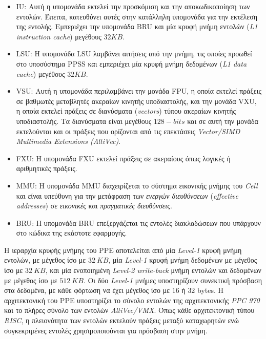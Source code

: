 \begin{itemize}

\item{\acf{IU}: Αυτή η υπομονάδα εκτελεί την προσκόμιση και την αποκωδικοποίηση των εντολών. Έπειτα, κατευθύνει αυτές στην κατάλληλη υπομονάδα για την εκτέλεση της εντολής. Εμπεριέχει την υπομονάδα \acf{BRU} και μία κρυφή μνήμη εντολών (\textsl{L1 instruction cache}) μεγέθους \(32KB\).}

\item{\acf{LSU}: Η υπομονάδα \ac{LSU} λαμβάνει αιτήσεις από την μνήμη, τις οποίες προωθεί στο υποσύστημα \ac{PPSS} και εμπεριέχει μία κρυφή μνήμη δεδομένων (\textsl{L1 data cache}) μεγέθους \(32KB\).}

\item{\acf{VSU}: Αυτή η υπομονάδα περιλαμβάνει την μονάδα \acf{FPU}, η οποία εκτελεί πράξεις σε βαθμωτές μεταβλητές ακεραίων κινητής υποδιαστολής, και την μονάδα \acf{VXU}, η οποία εκτελεί πράξεις σε διανύσματα (\textsl{vectors}) τύπου ακεραίων κινητής υποδιαστολής. Τα διανύσματα είναι μεγέθους \(128-bits\) και σε αυτή την μονάδα εκτελούνται και οι πράξεις που ορίζονται από τις επεκτάσεις \textsl{Vector/SIMD Multimedia Extensions (AltiVec)}.}

\item{\acf{FXU}: Η υπομονάδα \ac{FXU} εκτελεί πράξεις σε ακεραίους όπως λογικές ή αριθμητικές πράξεις.}

\item{\acf{MMU}: Η υπομονάδα \ac{MMU} διαχειρίζεται το σύστημα εικονικής μνήμης του \textsl{Cell} και είναι υπεύθυνη για την μετάφραση των \textsl{ενεργών διευθύνσεων} (\textsl{effective addresses}) σε \textsl{εικονικές} και \textsl{πραγματικές διευθύνσεις}.}

\item{\acf{BRU}: Η υπομονάδα \ac{BRU} επεξεργάζεται τις εντολές διακλαδώσεων που υπάρχουν στο κώδικα της εκάστοτε εφαρμογής.}

\end{itemize}
\indent
Η ιεραρχία κρυφής μνήμης του \ac{PPE} αποτελείται από μία \textsl{Level-1} κρυφή μνήμη εντολών, με μέγεθος ίσο με \(32\ KB\), μία \textsl{Level-1} κρυφή μνήμη δεδομένων με μέγεθος ίσο με \(32\ KB\), και μία ενοποιημένη \textsl{Level-2 write-back} μνήμη εντολών και δεδομένων με μέγεθος ίσο με \(512\ KB\). Οι δύο \textsl{Level-1} μνήμες υποστηρίζουν συνεκτική πρόσβαση στα δεδομένα, με κάθε φόρτωση να έχει μέγεθος ίσο με \(16\) ή \(32\) bytes.\newline \indent
Η αρχιτεκτονική του \ac{PPE} υποστηρίζει το σύνολο εντολών της αρχιτεκτονικής \textsl{PPC 970} και το πλήρες σύνολο των εντολών \textsl{AltiVec/VMX}. Όπως κάθε αρχιτεκτονική τύπου \textsl{RISC}, η πλειονότητα των εντολών εκτελούν πράξεις μεταξύ καταχωρητών ενώ συγκεκριμένες εντολές χρησιμοποιούνται για πρόσβαση στην μνήμη.\newline \indent

